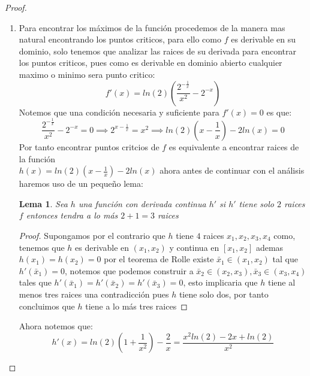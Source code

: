 \documentclass[11pt,letterpaper]{article}
\newtheorem{lemma}[theorem]{Lema}
\begin{document}
\begin{proof}
\begin{enumerate}
\begin{equation*}
        \end{equation*}
        \newpage
        \item Para encontrar los m\'aximos de la funci\'on procedemos de la manera mas natural encontrando los puntos criticos, para ello como $f$ es derivable en su dominio, solo tenemos que analizar las raices de su derivada para encontrar los puntos criticos, pues como es derivable en dominio abierto cualquier maximo o minimo sera punto critico:
        \begin{equation*}
            f'(x)=ln(2)\left(\frac{2^{-\frac{1}{x}}}{x^2}-2^{-x}\right)
        \end{equation*}
        Notemos que una condici\'on necesaria y suficiente para $f'(x)=0$ es que:\,\\
        \begin{equation*}
            \frac{2^{-\frac{1}{x}}}{x^2}-2^{-x}=0\implies 2^{x-\frac{1}{x}}=x^2\implies ln(2)\left(x-\frac{1}{x}\right)-2ln(x)=0
        \end{equation*}
        Por tanto encontrar puntos critcios de $f$ es equivalente a encontrar raices de la funci\'on\\$h(x)=ln(2)\left(x-\frac{1}{x}\right)-2ln(x)$
        ahora antes de continuar con el an\'alisis haremos uso de un pequeño lema:\,\\
        \begin{lemma}
            Sea $h$ una funci\'on con derivada continua $h'$ si $h'$ tiene solo $2$ raices $f$ entonces tendra a lo m\'as $2+1=3$ raices
        \end{lemma}
        \begin{proof}
            Supongamos por el contrario que $h$ tiene $4$ raices $x_1,x_2,x_3,x_4$ como, tenemos que $h$ es derivable en $(x_1,x_2)$ y continua en $[x_1,x_2]$ ademas $h(x_1)=h(x_2)=0$ por el teorema de Rolle existe $\bar{x}_1\in(x_1,x_2)$ tal que $h'(\bar{x}_1)=0$, notemos que podemos construir a $\bar{x}_2\in(x_2,x_3),\bar{x}_3\in(x_3,x_4)$ tales que $h'(\bar{x}_1)=h'(\bar{x}_2)=h'(\bar{x}_3)=0$, esto implicaria que $h$ tiene al menos tres raices una contradicci\'on pues $h$ tiene solo dos,
            por tanto concluimos que $h$ tiene a lo m\'as tres raices
        \end{proof}
        Ahora notemos que:\,\\
        \begin{equation*}
            h'(x)=ln(2)\left(1+\frac{1}{x^2}\right)-\frac{2}{x}=\frac{x^2ln(2)-2x+ln(2)}{x^2}
        \end{equation*}

\end{enumerate}
\end{proof}
\end{document}
